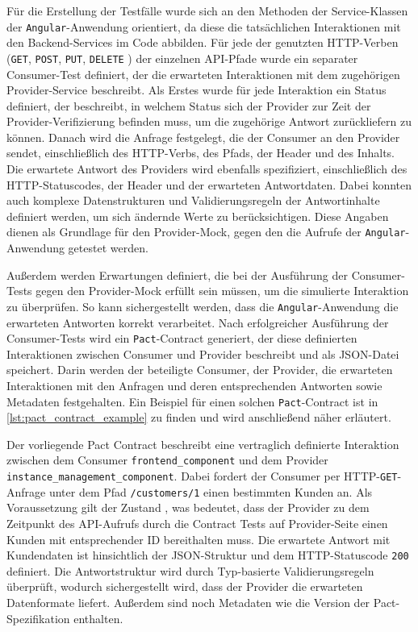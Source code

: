 Für die Erstellung der Testfälle wurde sich an den Methoden der Service-Klassen der \texttt{\gls{Angular}}-Anwendung orientiert, da diese die tatsächlichen Interaktionen mit den Backend-Services im Code abbilden.
Für jede der genutzten \gls{HTTP}-Verben (\texttt{GET}, \texttt{POST}, \texttt{PUT}, \texttt{DELETE} \usw) der einzelnen \gls{API}-Pfade wurde ein separater Consumer-Test definiert, der die erwarteten Interaktionen mit dem zugehörigen Provider-Service beschreibt.
Als Erstes wurde für jede Interaktion ein Status definiert, der beschreibt, in welchem Status sich der Provider zur Zeit der Provider-Verifizierung befinden muss, um die zugehörige Antwort zurückliefern zu können.
Danach wird die Anfrage festgelegt, die der Consumer an den Provider sendet, einschließlich des \gls{HTTP}-Verbs, des Pfads, der Header und des Inhalts.
Die erwartete Antwort des Providers wird ebenfalls spezifiziert, einschließlich des \gls{HTTP}-Statuscodes, der Header und der erwarteten Antwortdaten.
Dabei konnten auch komplexe Datenstrukturen und Validierungsregeln der Antwortinhalte definiert werden, um sich ändernde Werte zu berücksichtigen.
Diese Angaben dienen als Grundlage für den Provider-\gls{Mock}, gegen den die Aufrufe der \texttt{\gls{Angular}}-Anwendung getestet werden.

Außerdem werden Erwartungen definiert, die bei der Ausführung der Consumer-Tests gegen den Provider-\gls{Mock} erfüllt sein müssen, um die simulierte Interaktion zu überprüfen.
So kann sichergestellt werden, dass die \texttt{\gls{Angular}}-Anwendung die erwarteten Antworten korrekt verarbeitet.
Nach erfolgreicher Ausführung der Consumer-Tests wird ein \texttt{Pact}-Contract generiert, der diese definierten Interaktionen zwischen Consumer und Provider beschreibt und als \gls{JSON}-Datei speichert.
Darin werden der beteiligte Consumer, der Provider, die erwarteten Interaktionen mit den Anfragen und deren entsprechenden Antworten sowie Metadaten festgehalten.
Ein Beispiel für einen solchen \texttt{Pact}-Contract ist in \cref{lst:pact_contract_example} zu finden und wird anschließend näher erläutert.



Der vorliegende Pact Contract beschreibt eine vertraglich definierte Interaktion zwischen dem Consumer \texttt{frontend\_component} und dem Provider \texttt{instance\_management\_component}.
Dabei fordert der Consumer per \gls{HTTP}-\texttt{GET}-Anfrage unter dem Pfad \texttt{/customers/1} einen bestimmten Kunden an.
Als Voraussetzung gilt der Zustand , was bedeutet, dass der Provider zu dem Zeitpunkt des \gls{API}-Aufrufs durch die Contract Tests auf Provider-Seite einen Kunden mit entsprechender ID bereithalten muss.
Die erwartete Antwort mit Kundendaten ist hinsichtlich der \gls{JSON}-Struktur und dem \gls{HTTP}-Statuscode \texttt{200} definiert.
Die Antwortstruktur wird durch Typ-basierte Validierungsregeln überprüft, wodurch sichergestellt wird, dass der Provider die erwarteten Datenformate liefert.
Außerdem sind noch Metadaten wie \zB die Version der Pact-Spezifikation enthalten.

